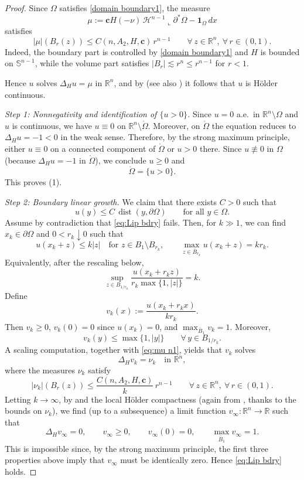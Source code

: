 \documentclass[reqno,11pt]{amsart}
\def\dist{{\mathop\mathrm{dist}}}
\numberwithin{equation}{section}
\theoremstyle{remark}
\begin{document}
\begin{proof}
Since $\Omega$ satisfies \eqref{domain boundary1}, the measure
\[
\mu:=\mathbf{c}H(-\nu)\,\mathscr{H}^{n-1}\llcorner \partial^*\Omega - \mathbf{1}_{\Omega}\,dx
\]
satisfies
\begin{equation}\label{eq:mu n1}
|\mu|(B_r(z))\leq C(n,A_2,H,\mathbf{c})\,r^{n-1}\qquad \forall\,z \in \mathbb R^n,\ \forall\,r \in (0,1).
\end{equation}
Indeed, the boundary part is controlled by \eqref{domain boundary1} and $H$ is bounded on $\mathbb S^{n-1}$, while the volume
part satisfies $|B_r|\lesssim r^n\le r^{n-1}$ for $r<1$.

Hence $u$ solves $\Delta_H u=\mu$ in $\mathbb R^n$, and by \cite[Equation (1.29)]{KM12} (see also \cite{KM1994}) it follows that
$u$ is H\"older continuous.

\medskip
\noindent\textit{Step 1: Nonnegativity and identification of $\{u>0\}$.}
Since $u=0$ a.e.\ in $\mathbb R^n\setminus\Omega$ and $u$ is continuous, we have $u\equiv 0$ on $\mathbb R^n\setminus\mathring\Omega$.
Moreover, on $\mathring\Omega$ the equation reduces to $\Delta_Hu=-1<0$ in the weak sense. Therefore, by the strong maximum
principle, either $u\equiv 0$ on a connected component of $\mathring\Omega$ or $u>0$ there. Since $u\not\equiv 0$ in $\Omega$
(because $\Delta_Hu=-1$ in $\mathring\Omega$), we conclude $u\ge 0$ and
\[
\mathring\Omega=\{u>0\}.
\]
This proves (1).

\medskip
\noindent\textit{Step 2: Boundary linear growth.}
We claim that there exists $C>0$ such that
\begin{equation}\label{eq:Lip bdry}
u(y)\le C\,\dist(y,\partial\Omega)\qquad \text{for all }y\in \Omega.
\end{equation}
Assume by contradiction that \eqref{eq:Lip bdry} fails. {Then, for $k\gg 1$, we can find
$x_k\in \partial\Omega$ and $0<r_k\downarrow0$ such that
\[
u(x_k+z)\le k|z|\quad\text{for }z\in B_1\setminus B_{r_k},
\qquad
\max_{z\in \overline B_{r_k}}u(x_k+z)=kr_k.
\]
Equivalently, after the rescaling below,
\[
\sup_{z\in B_{1/r_k}}\frac{u(x_k+r_k z)}{r_k\max\{1,|z|\}}=k.
\]}
Define
\[
v_k(x):=\frac{u(x_k +r_k x)}{kr_k}.
\]
Then $v_k\ge 0$, $v_k(0)=0$ since $u(x_k)=0$, and $\max_{\overline B_1}v_k = 1$. Moreover,
\[
v_k(y)\le \max\{1,|y|\}\qquad \forall\,y \in B_{1/r_k}.
\]
A scaling computation, together with \eqref{eq:mu n1}, yields that $v_k$ solves
\[
\Delta_H v_k=\nu_k \quad\text{in }\mathbb R^n,
\]
where the measures $\nu_k$ satisfy
\[
|\nu_k|(B_r(z))\leq \frac{C(n,A_2,H,\mathbf{c})}{k}\,r^{n-1}\qquad \forall\,z\in\mathbb R^n,\ \forall\,r\in(0,1).
\]
Letting $k \to \infty$, by \cite{BM92} and the local H\"older compactness (again from \cite{KM12}, thanks to the bounds on $\nu_k$),
we find (up to a subsequence) a limit function $v_\infty:\mathbb R^n\to \mathbb R$ such that
\[
\Delta_H v_\infty =0,\qquad v_\infty \ge 0,\qquad v_\infty(0)=0,\qquad \max_{\overline B_1}v_\infty = 1.
\]
This is impossible since, by the strong maximum principle, the first three properties above imply that $v_\infty$ must be identically zero. Hence \eqref{eq:Lip bdry} holds.


\end{proof}
\end{document}
